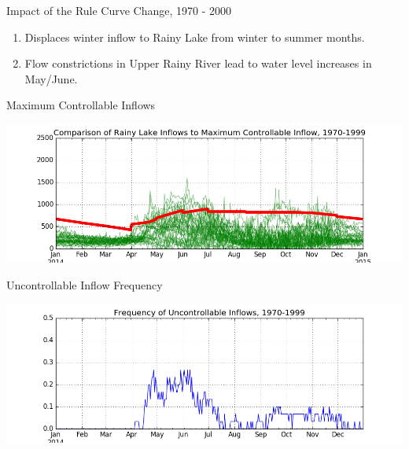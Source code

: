 \documentclass[compress,english]{beamer}
\begin{document}
{{{{{{\begin{frame}{Impact of the Rule Curve Change, 1970 - 2000}
\begin{enumerate}
\item Displaces winter inflow to Rainy Lake from winter to summer months.
\item Flow constrictions in Upper Rainy River lead to water level increases in May/June.
\end{enumerate}

\end{frame}


\begin{frame}{Maximum Controllable Inflows}

\begin{center}
\includegraphics[width=0.8\paperwidth]{RLMaxFlow1970.png}


\end{center}

\end{frame}

\begin{frame}{Uncontrollable Inflow Frequency}

\begin{center}
\includegraphics[width=0.8\paperwidth]{RLMaxFlowFreq1970.png}

\end{center}


\end{frame}}}}}}}
\end{document}
